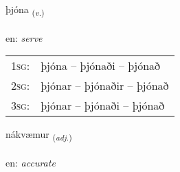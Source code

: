 \documentclass[frontgrid, backgrid]{flacards}\usepackage[]{graphicx}\usepackage[]{color}
\begin{document}
\renewcommand{\flhead}{\vskip5pt \fboxsep=0pt {\small\bfseries\footnotesize Sagnorð | Verb}}
\renewcommand{\fcfoot}{\vskip5pt \fboxsep=0pt \hspace{2pt}{\small\bfseries\footnotesize 2K}}

\renewcommand{\blhead}{\vskip5pt {\small\bfseries\footnotesize Sagnorð | Verb }}
\renewcommand{\bcfoot}{\vskip5pt \hspace{2pt}{\small\bfseries\footnotesize 2K}}


{þjóna \small{\textsubscript{(\textit{v.})}} \\[1ex] %
\textphonetic{[θjouːna]} \\
en: \emph{serve} \\  [2ex]
\renewcommand*{\arraystretch}{0.8}
\begin{tabular}{p{1cm}l}
\textsc{1sg}: & þjóna -- þjónaði -- þjónað \\ 
\textsc{2sg}: & þjónar -- þjónaðir -- þjónað \\ 
\textsc{3sg}: & þjónar -- þjónaði -- þjónað \\ 
\end{tabular}
}

\renewcommand{\flhead}{\vskip5pt \fboxsep=0pt {\small\bfseries\footnotesize Lýsingarorð | Adjective}}
\renewcommand{\fcfoot}{\vskip5pt \fboxsep=0pt \hspace{2pt}{\small\bfseries\footnotesize 2K}}

\renewcommand{\blhead}{\vskip5pt {\small\bfseries\footnotesize Lýsingarorð | Adjective }}
\renewcommand{\bcfoot}{\vskip5pt \hspace{2pt}{\small\bfseries\footnotesize 2K}}


{nákvæmur \small{\textsubscript{(\textit{adj.})}} \\[1ex] %
\textphonetic{[nauːkʰvaimʏr]} \\
en: \emph{accurate} \\  [2ex]
\renewcommand*{\arraystretch}{0.8}
}
\end{document}
